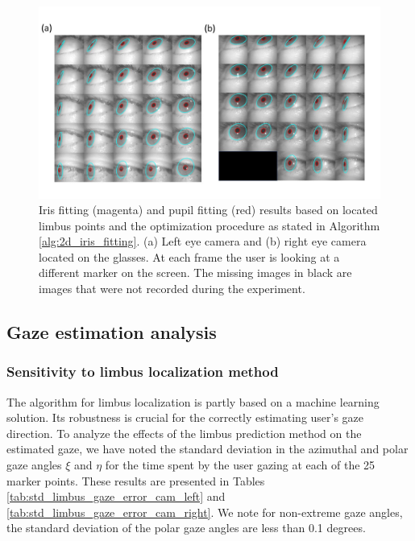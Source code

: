 \documentclass{article}
\begin{document}
\begin{figure}[h!]
    \center
    \includegraphics[scale=0.4]{./Pics/iris_fitting.JPG}
    \caption{Iris fitting (magenta) and pupil fitting (red) results based on located limbus points and the optimization procedure as stated in Algorithm \ref{alg:2d_iris_fitting}. (a) Left eye camera  and (b) right eye camera located on the glasses. At each frame the user is looking at a different marker on the screen. The missing images in black are images that were not recorded during the experiment. } 
    \label{fig:iris_fitting}
\end{figure}

\subsection{Gaze estimation analysis}
\subsubsection{Sensitivity to limbus localization method}
The algorithm for limbus localization is partly based on a machine learning solution. Its robustness is crucial for the correctly estimating user's gaze direction.  To analyze the effects of the limbus prediction method on the estimated gaze, we have noted the standard deviation in the azimuthal and polar gaze angles $\xi$ and $\eta$ for the time spent by the user gazing at each of the 25 marker points.  These results are presented in Tables \ref{tab:std_limbus_gaze_error_cam_left} and \ref{tab:std_limbus_gaze_error_cam_right}. We note for non-extreme gaze angles, the standard deviation of the polar gaze angles are less than 0.1 degrees.
\end{document}
